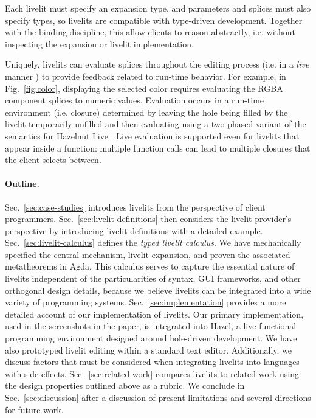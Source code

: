  Each livelit must specify an expansion type, 
and parameters and splices must also specify types, 
so livelits are compatible with type-driven development.
Together with the binding discipline, 
this allow clients to reason abstractly, i.e.  
without inspecting the expansion or livelit implementation.

 Uniquely, livelits can evaluate splices 
  throughout the editing process 
  (i.e. in a \emph{live} manner \cite{DBLP:conf/icse/Tanimoto13}) 
  to provide feedback related to run-time behavior.
  For example, in Fig.~\ref{fig:color}, 
  displaying the selected color requires evaluating the RGBA
  component splices to numeric values.
  Evaluation occurs in a run-time environment (i.e. closure) determined by
  leaving the hole being filled by the livelit temporarily unfilled and then evaluating
  using a two-phased variant of the semantics for 
  Hazelnut Live \cite{HazelnutLive}.
  Live evaluation is supported even for livelits 
  that appear inside a function: multiple function calls 
  can lead 
  to multiple closures that the client 
   selects between.

\paragraph{Outline.} Sec.~\ref{sec:case-studies} introduces
livelits from the perspective of client programmers. 
Sec.~\ref{sec:livelit-definitions} then 
considers the livelit provider's perspective by introducing livelit
definitions with a detailed example.
Sec.~\ref{sec:livelit-calculus} defines the \emph{typed livelit calculus}. 
We have mechanically specified the central mechanism, livelit expansion, 
and proven the associated metatheorems in Agda.
This calculus 
serves to capture the essential nature of livelits 
independent of the particularities of syntax, GUI frameworks, 
and other orthogonal design details,
because we believe livelits can be integrated into a wide variety of programming systems. 
Sec.~\ref{sec:implementation} provides a more detailed account of our implementation of livelits.
Our primary implementation, used in the screenshots in the paper,
is integrated into Hazel, a live functional programming environment designed 
around hole-driven development. 
We have also prototyped livelit editing within a standard text editor. 
Additionally, we discuss factors that must be considered when integrating livelits into languages with side effects.
Sec.~\ref{sec:related-work} compares livelits to related work using the design properties outlined above 
as a rubric.
We conclude in Sec.~\ref{sec:discussion} after a discussion of present limitations and several directions for future work.